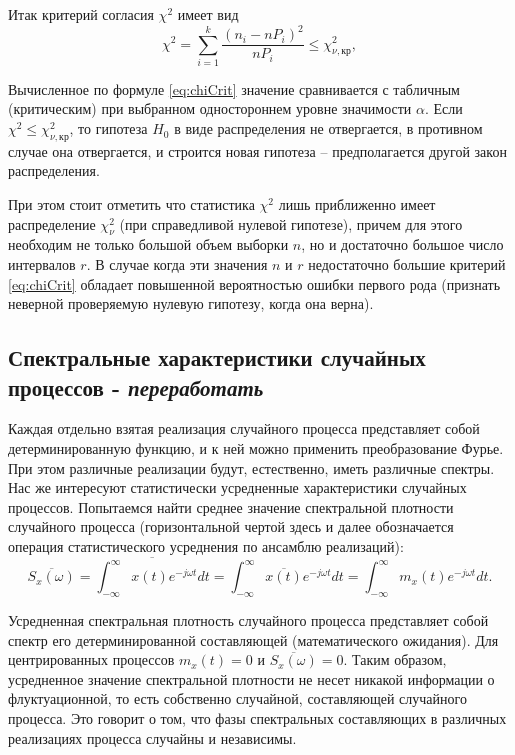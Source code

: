Итак критерий согласия $\chi^2$ имеет вид
\begin{equation}\label{eq:chiCrit}
  \chi^2=\sum\limits_{i=1}^k\frac{(n_i-nP_i)^2}{nP_i}\le\chi_{\nu,кр}^2,
\end{equation}

Вычисленное по формуле \eqref{eq:chiCrit} значение сравнивается с табличным (критическим) при выбранном одностороннем уровне значимости $\alpha$. Если $\chi^2\le\chi_{\nu,кр}^2$, то гипотеза $H_0$ в виде распределения не отвергается, в противном случае она отвергается, и строится новая гипотеза -- предполагается другой закон распределения.

При этом стоит отметить что статистика $\chi^2$ лишь приближенно имеет распределение $\chi^2_{\nu}$ (при справедливой нулевой гипотезе), причем для этого необходим не только большой объем выборки $n$, но и достаточно большое число интервалов $r$. В случае когда эти значения $n$ и $r$ недостаточно большие критерий \eqref{eq:chiCrit} обладает повышенной вероятностью ошибки первого рода  (признать неверной проверяемую нулевую гипотезу, когда она верна).

\subsection{ Спектральные характеристики случайных процессов - \emph{переработать}}

Каждая отдельно взятая реализация случайного процесса представляет собой детерминированную функцию, и к ней можно применить преобразование Фурье. При этом различные реализации будут, естественно, иметь различные спектры. Нас же интересуют статистически усредненные характеристики случайных процессов. Попытаемся найти среднее значение спектральной плотности случайного процесса (горизонтальной чертой здесь и далее обозначается операция статистического усреднения по ансамблю реализаций):
\begin{equation} \label{GrindEQ__1_5_1_}
\overline{S_{x} (\omega )}=\overline{\int _{-\infty }^{\infty }x(t)e^{-j\omega t} dt }=\int _{-\infty }^{\infty }\overline{x(t)}e^{-j\omega t} dt =\int _{-\infty }^{\infty }m_{x} (t)e^{-j\omega t} dt .
\end{equation}

Усредненная спектральная плотность случайного процесса представляет собой спектр его детерминированной составляющей (математического ожидания). Для центрированных процессов $m_{x} (t)=0$ и $\overline{S_{x} (\omega )}=0$. Таким образом, усредненное значение спектральной плотности не несет никакой информации о флуктуационной, то есть собственно случайной, составляющей случайного процесса. Это говорит о том, что фазы спектральных составляющих в различных реализациях процесса случайны и независимы.

